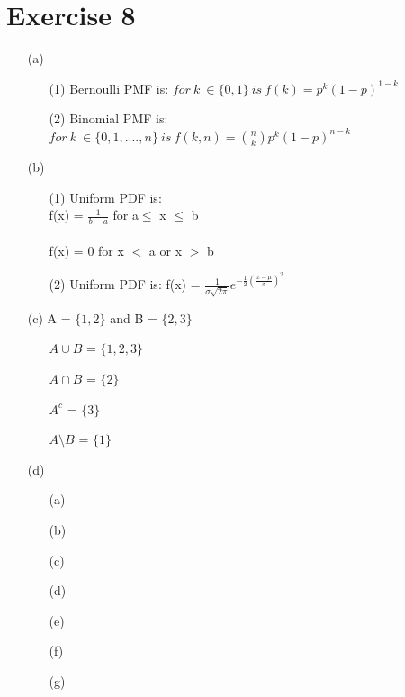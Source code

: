 \documentclass[a4paper]{article}
\begin{document}
\section*{Exercise 8}
\begin{itemize}
\item[(a)]
\begin{itemize}
\item[(1)]Bernoulli PMF is: $ for\ k\ \in \{0,1\}\ is\ f(k) = p^{k}(1-p)^{1-k}$
\item[(2)]Binomial PMF is: $ for\ k\ \in \{0,1, ...., n\}\ is\ f(k,n) = {n\choose k} p^{k}(1-p)^{n-k}$
\end{itemize}
\item[(b)]
\begin{itemize}
\item[(1)]Uniform PDF is:\\

f(x) = $\frac{1}{b-a}$ for a$\leq$ x $\leq$ b\\\\
f(x) = 0 for x $<$ a or x $>$ b

\item[(2)]Uniform PDF is: f(x) = $\frac{1}{\sigma\sqrt{2\pi}}e^{-\frac{1}{2}(\frac{x-\mu}{\sigma})^{2}}$

\end{itemize}
\item[(c)]A = $\{1,2\}$ and B = $\{2,3\}$
\begin{itemize}
\item[$A \cup B$] = $\{1,2,3\}$
\item[$A \cap B$] = $\{2\}$
\item[$A^{c}$] = $\{3\}$
\item[$A \setminus B$] = $\{1\}$
\end{itemize}
\item[(d)]
\begin{itemize}
\item[(a)]
\item[(b)]
\item[(c)]
\item[(d)]
\item[(e)]
\item[(f)]
\item[(g)]
\end{itemize}
\end{itemize}
\end{document}
